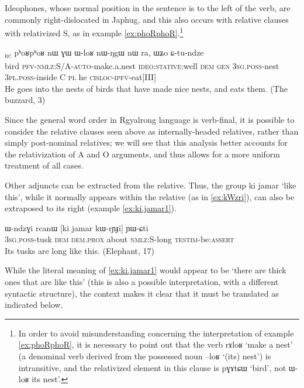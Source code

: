 \documentclass[oldfontcommands,oneside,a4paper,11pt]{article}
\newcommand{\ipa}[1]{{\phon #1}} %
\newcommand{\topic}{\textsc{dem}}
\newcommand{\tete}{\textsuperscript{\textsc{head}}}
\newcommand{\rc}{\textsubscript{\textsc{rc}}}
\begin{document}
Ideophones, whose normal position in the sentence is to the  left of the verb, are commonly right-dislocated in Japhug, and this also occurs with relative clauses with relativized S, as in example \ref{ex:phoRphoR}.\footnote{In order to avoid misunderstanding concerning the interpretation of example \ref{ex:phoRphoR}, it is necessary to point out that the verb \ipa{rɤloʁ} `make a nest' (a denominal verb derived from the possessed noun \ipa{--loʁ} `(its) nest') is intransitive, and the relativized element in this clause is \ipa{pɣɤtɕɯ}  `bird', not   \ipa{ɯ-loʁ}  its nest'. }

  \begin{exe}
   \ex   \label{ex:phoRphoR}
 \gll [\ipa{pɣɤtɕɯ}\tete{}   	\ipa{kɤ-kɯ-nɯ-rɤloʁ}]\rc{}  	\ipa{pʰoʁpʰoʁ}  	\ipa{nɯ}  	\ipa{ɣɯ}  	\ipa{ɯ-loʁ}  	\ipa{nɯ-ŋgɯ}  	\ipa{nɯ}  	\ipa{ra,}  	\ipa{ɯʑo}  	\ipa{ɕ-tu-ndze}  \\
 bird \textsc{pfv-nmlz:S/A-auto}-make.a.nest \textsc{ideo:stative:}well \textsc{dem} \textsc{gen} \textsc{3sg.poss}-nest \textsc{3pl.poss}-inside C \textsc{pl} he \textsc{cisloc-ipfv}-eat[III] \\
 \glt  He goes into the nests of birds that have made nice nests, and eats them. (The buzzard, 3)
   \end{exe}  

  
  Since the general word order in Rgyalrong language is verb-final, it is possible to consider the relative clauses seen above as internally-headed relatives, rather than simply post-nominal relatives; we will see that this analysis better accounts for the relativization of A and O arguments, and thus allows for a more uniform treatment of all cases.

Other adjuncts can be extracted from the relative. Thus, the group \ipa{ki jamar} `like this', while it normally appears within the relative (as in \ref{ex:kWzri}), can also be extraposed to its right (example \ref{ex:ki.jamar1}).

\begin{exe}
   \ex  \label{ex:kWzri}
   \gll
\ipa{ɯ-ndzɣi}   	\ipa{rcanɯ}   	[\ipa{ki}   	\ipa{jamar}   	\ipa{kɯ-rɲɟi}]   	\ipa{ɲɯ-ɕti}    \\
\textsc{3sg.poss}-tusk \topic{}   \textsc{dem.prox} about \textsc{nmlz:S}-long \textsc{testim}-be:\textsc{assert} \\
\glt Its tusks are long like this. (Elephant, 17)
\end{exe}

While the literal meaning of \ref{ex:ki.jamar1} would appear to be `there are thick ones that are like this' (this is also a possible interpretation, with a different syntactic structure), the context makes it clear that it must be translated as indicated below.
\end{document}
